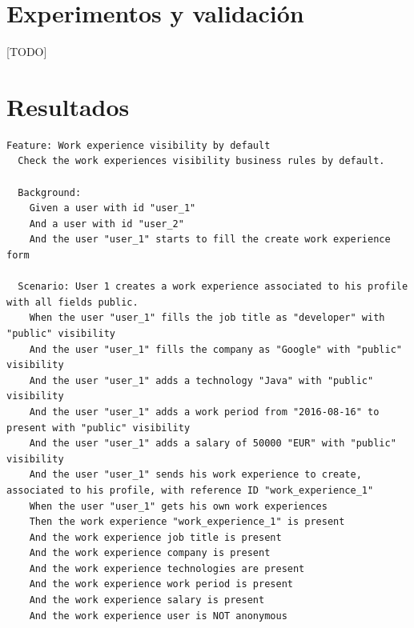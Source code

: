 \documentclass[a4paper, 12pt]{book}
\begin{document}
    \cleardoublepage
    \chapter{Experimentos y validación}

    [TODO]



    \cleardoublepage
    \chapter{Resultados}

    {\footnotesize
        \begin{verbatim}
Feature: Work experience visibility by default
  Check the work experiences visibility business rules by default.

  Background:
    Given a user with id "user_1"
    And a user with id "user_2"
    And the user "user_1" starts to fill the create work experience form

  Scenario: User 1 creates a work experience associated to his profile with all fields public.
    When the user "user_1" fills the job title as "developer" with "public" visibility
    And the user "user_1" fills the company as "Google" with "public" visibility
    And the user "user_1" adds a technology "Java" with "public" visibility
    And the user "user_1" adds a work period from "2016-08-16" to present with "public" visibility
    And the user "user_1" adds a salary of 50000 "EUR" with "public" visibility
    And the user "user_1" sends his work experience to create, associated to his profile, with reference ID "work_experience_1"
    When the user "user_1" gets his own work experiences
    Then the work experience "work_experience_1" is present
    And the work experience job title is present
    And the work experience company is present
    And the work experience technologies are present
    And the work experience work period is present
    And the work experience salary is present
    And the work experience user is NOT anonymous


\end{verbatim}}
\end{document}
